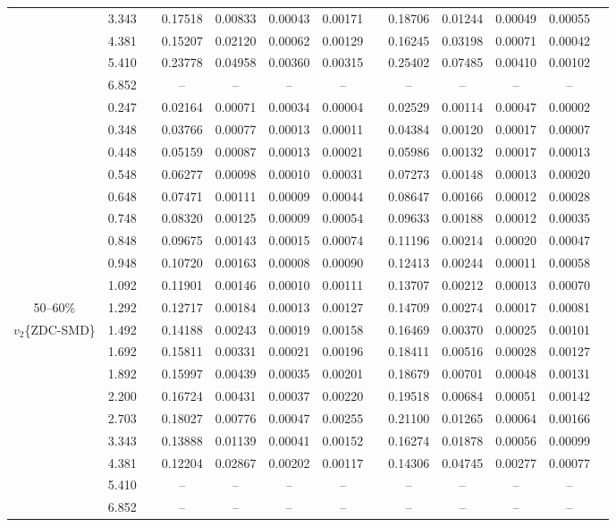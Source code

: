 \documentclass[aps,prc,superscriptaddress,showpacs,floatfix,twocolumn]{revtex4}
\begin{document}
\begin{table}[htbp]
\begin{ruledtabular}
\begin{tabular}{c|cccccccccccc}
 & 3.343 && 0.17518 & 0.00833 & 0.00043 & 0.00171 & & 0.18706 & 0.01244 & 0.00049 & 0.00055 \\ 
 & 4.381 && 0.15207 & 0.02120 & 0.00062 & 0.00129 & & 0.16245 & 0.03198 & 0.00071 & 0.00042 \\ 
 & 5.410 && 0.23778 & 0.04958 & 0.00360 & 0.00315 & & 0.25402 & 0.07485 & 0.00410 & 0.00102 \\ 
 & 6.852 && -- & -- & -- & -- & & -- & -- & -- & -- \\ 
\hline 
 & 0.247 && 0.02164 & 0.00071 & 0.00034 & 0.00004 & & 0.02529 & 0.00114 & 0.00047 & 0.00002 \\ 
 & 0.348 && 0.03766 & 0.00077 & 0.00013 & 0.00011 & & 0.04384 & 0.00120 & 0.00017 & 0.00007 \\ 
 & 0.448 && 0.05159 & 0.00087 & 0.00013 & 0.00021 & & 0.05986 & 0.00132 & 0.00017 & 0.00013 \\ 
 & 0.548 && 0.06277 & 0.00098 & 0.00010 & 0.00031 & & 0.07273 & 0.00148 & 0.00013 & 0.00020 \\ 
 & 0.648 && 0.07471 & 0.00111 & 0.00009 & 0.00044 & & 0.08647 & 0.00166 & 0.00012 & 0.00028 \\ 
 & 0.748 && 0.08320 & 0.00125 & 0.00009 & 0.00054 & & 0.09633 & 0.00188 & 0.00012 & 0.00035 \\ 
 & 0.848 && 0.09675 & 0.00143 & 0.00015 & 0.00074 & & 0.11196 & 0.00214 & 0.00020 & 0.00047 \\ 
 & 0.948 && 0.10720 & 0.00163 & 0.00008 & 0.00090 & & 0.12413 & 0.00244 & 0.00011 & 0.00058 \\ 
 & 1.092 && 0.11901 & 0.00146 & 0.00010 & 0.00111 & & 0.13707 & 0.00212 & 0.00013 & 0.00070 \\ 
50--60\%
 & 1.292 && 0.12717 & 0.00184 & 0.00013 & 0.00127 & & 0.14709 & 0.00274 & 0.00017 & 0.00081 \\ 
$v_2$\{ZDC-SMD\}
 & 1.492 && 0.14188 & 0.00243 & 0.00019 & 0.00158 & & 0.16469 & 0.00370 & 0.00025 & 0.00101 \\ 
 & 1.692 && 0.15811 & 0.00331 & 0.00021 & 0.00196 & & 0.18411 & 0.00516 & 0.00028 & 0.00127 \\ 
 & 1.892 && 0.15997 & 0.00439 & 0.00035 & 0.00201 & & 0.18679 & 0.00701 & 0.00048 & 0.00131 \\ 
 & 2.200 && 0.16724 & 0.00431 & 0.00037 & 0.00220 & & 0.19518 & 0.00684 & 0.00051 & 0.00142 \\ 
 & 2.703 && 0.18027 & 0.00776 & 0.00047 & 0.00255 & & 0.21100 & 0.01265 & 0.00064 & 0.00166 \\ 
 & 3.343 && 0.13888 & 0.01139 & 0.00041 & 0.00152 & & 0.16274 & 0.01878 & 0.00056 & 0.00099 \\ 
 & 4.381 && 0.12204 & 0.02867 & 0.00202 & 0.00117 & & 0.14306 & 0.04745 & 0.00277 & 0.00077 \\ 
 & 5.410 && -- & -- & -- & -- & & -- & -- & -- & -- \\ 
 & 6.852 && -- & -- & -- & -- & & -- & -- & -- & -- \\ 
\end{tabular} \end{ruledtabular} \endgroup
\end{table}
\end{document}
